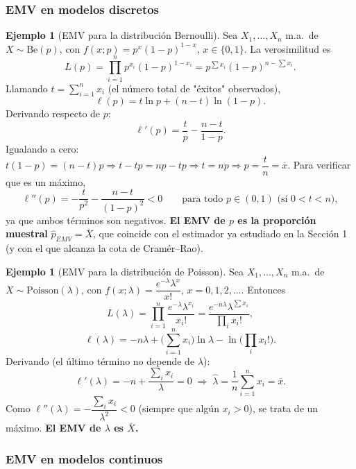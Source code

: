 \documentclass[11pt,a4paper]{article}
\theoremstyle{plain}
\theoremstyle{definition}
\newtheorem{ejemplo}[teorema]{Ejemplo}
\theoremstyle{remark}
\begin{document}
\subsubsection{EMV en modelos discretos}

\begin{ejemplo}[EMV para la distribución Bernoulli]
Sea $X_1,\dots,X_n$ m.a.\ de $X\sim\text{Be}(p)$, con $f(x;p)=p^x(1-p)^{1-x}$, $x\in\{0,1\}$. La verosimilitud es
\[
L(p) = \prod_{i=1}^n p^{x_i}(1-p)^{1-x_i} = p^{\sum x_i}(1-p)^{n-\sum x_i}.
\]
Llamando $t=\sum_{i=1}^n x_i$ (el número total de "éxitos" observados),
\[
\ell(p) = t\ln p + (n-t)\ln(1-p).
\]
Derivando respecto de $p$:
\[
\ell'(p) = \frac{t}{p}-\frac{n-t}{1-p}.
\]
Igualando a cero: $t(1-p)=(n-t)p \Rightarrow t-tp=np-tp \Rightarrow t=np \Rightarrow \widehat p = \dfrac{t}{n}=\overline x$. Para verificar que es un máximo,
\[
\ell''(p) = -\frac{t}{p^2}-\frac{n-t}{(1-p)^2} < 0 \qquad \text{para todo } p\in(0,1) \text{ (si } 0<t<n\text{)},
\]
ya que ambos términos son negativos. \textbf{El EMV de $p$ es la proporción muestral} $\widehat p_{EMV}=\overline X$, que coincide con el estimador ya estudiado en la Sección 1 (y con el que alcanza la cota de Cramér--Rao).
\end{ejemplo}

\begin{ejemplo}[EMV para la distribución de Poisson]
Sea $X_1,\dots,X_n$ m.a.\ de $X\sim\text{Poisson}(\lambda)$, con $f(x;\lambda)=\dfrac{e^{-\lambda}\lambda^x}{x!}$, $x=0,1,2,\dots$. Entonces
\[
L(\lambda) = \prod_{i=1}^n \frac{e^{-\lambda}\lambda^{x_i}}{x_i!} = \frac{e^{-n\lambda}\lambda^{\sum x_i}}{\prod_i x_i!},
\]
\[
\ell(\lambda) = -n\lambda + \Big(\sum_{i=1}^n x_i\Big)\ln\lambda - \ln\Big(\prod_i x_i!\Big).
\]
Derivando (el último término no depende de $\lambda$):
\[
\ell'(\lambda) = -n+\frac{\sum_i x_i}{\lambda} = 0 \;\Longrightarrow\; \widehat\lambda = \frac1n\sum_{i=1}^n x_i = \overline x.
\]
Como $\ell''(\lambda)=-\dfrac{\sum_i x_i}{\lambda^2}<0$ (siempre que algún $x_i>0$), se trata de un máximo. \textbf{El EMV de $\lambda$ es $\overline X$.}
\end{ejemplo}

\subsubsection{EMV en modelos continuos}
\end{document}
